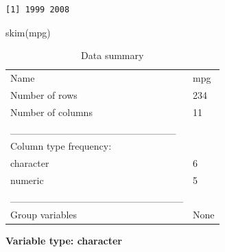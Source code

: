 \documentclass[
  letterpaper,
  DIV=11,
  numbers=noendperiod]{scrartcl}
\newenvironment{Shaded}{\begin{snugshade}}{\end{snugshade}}
\newcommand{\FunctionTok}[1]{\textcolor[rgb]{0.28,0.35,0.67}{#1}}
\newcommand{\NormalTok}[1]{\textcolor[rgb]{0.00,0.23,0.31}{#1}}
\begin{document}
\begin{verbatim}
[1] 1999 2008
\end{verbatim}

\begin{Shaded}
\begin{Highlighting}[]
\FunctionTok{skim}\NormalTok{(mpg)}
\end{Highlighting}
\end{Shaded}

\begin{longtable}[]{@{}ll@{}}
\caption{Data summary}\tabularnewline
\toprule\noalign{}
\endfirsthead
\endhead
\bottomrule\noalign{}
\endlastfoot
Name & mpg \\
Number of rows & 234 \\
Number of columns & 11 \\
\_\_\_\_\_\_\_\_\_\_\_\_\_\_\_\_\_\_\_\_\_\_\_ & \\
Column type frequency: & \\
character & 6 \\
numeric & 5 \\
\_\_\_\_\_\_\_\_\_\_\_\_\_\_\_\_\_\_\_\_\_\_\_\_ & \\
Group variables & None \\
\end{longtable}

\textbf{Variable type: character}
\end{document}
